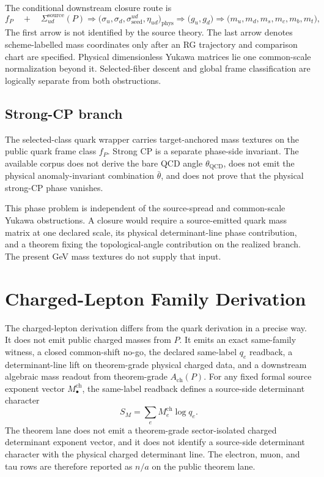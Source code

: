 \documentclass[11pt]{article}
\begin{document}
The conditional downstream closure route is
\[
f_P
\quad+\quad
\Sigma_{ud}^{\mathrm{source}}(P)
\Longrightarrow
\bigl(\sigma_u,\sigma_d,\sigma_{\mathrm{seed}}^{ud},\eta_{ud}\bigr)_{\mathrm{phys}}
\Longrightarrow
\bigl(g_u,g_d\bigr)
\Longrightarrow
\bigl(m_u,m_d,m_s,m_c,m_b,m_t\bigr),
\]
The first arrow is not identified by the source theory. The last arrow denotes scheme-labelled
mass coordinates only after an RG trajectory and comparison chart are specified. Physical
dimensionless Yukawa matrices lie one common-scale normalization beyond it. Selected-fiber
descent and global frame classification are logically separate from both obstructions.

\subsection{Strong-CP branch}\label{quark-family-strong-cp-boundary}

The selected-class quark wrapper carries target-anchored mass textures on the public quark frame
class \(f_P\). Strong CP is a separate phase-side invariant. The available corpus does not derive the
bare QCD angle \(\theta_{\mathrm{QCD}}\), does not emit the physical anomaly-invariant
combination \(\bar\theta\), and does not prove that the physical strong-CP phase vanishes.

This phase problem is independent of the source-spread and common-scale Yukawa obstructions. A
closure would require a source-emitted quark mass matrix at one declared scale, its physical
determinant-line phase contribution, and a theorem fixing the topological-angle contribution on the
realized branch. The present GeV mass textures do not supply that input.

\section{Charged-Lepton Family Derivation}

The charged-lepton derivation differs from the quark derivation in a precise way. It does not emit public charged masses from \(P\). It emits an exact same-family witness, a closed common-shift no-go, the declared same-label \(q_e\) readback, a determinant-line lift on theorem-grade physical charged data, and a downstream algebraic mass readout from theorem-grade \(A_{\mathrm{ch}}(P)\). For any fixed formal source exponent vector \(M_\bullet^{\mathrm{ch}}\), the same-label readback defines a source-side determinant character
\[
S_M=\sum_e M_e^{\mathrm{ch}}\log q_e.
\]
The theorem lane does not emit a theorem-grade sector-isolated charged determinant exponent vector, and it does not identify a source-side determinant character with the physical charged determinant line. The electron, muon, and tau rows are therefore reported as \(n/a\) on the public theorem lane.
\end{document}
